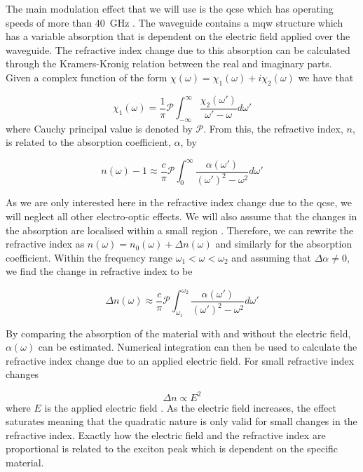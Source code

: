 The main modulation effect that we will use is the \ac{qcse} which has operating speeds of more than \SI{40}{GHz} \cite{qcse, smit2014}. The waveguide contains a \ac{mqw} structure which has a variable absorption that is dependent on the electric field applied over the waveguide. The refractive index change due to this absorption can be calculated through the Kramers-Kronig relation between the real and imaginary parts. Given a complex function of the form $\chi(\omega) = \chi_1(\omega) + i \chi_2(\omega)$ we have that

\begin{equation}
	\chi_1(\omega) = \frac{1}{\pi} \mathcal{P} \int_{-\infty}^{\infty} \frac{\chi_2(\omega')}{\omega' - \omega} d\omega'
\end{equation}
where Cauchy principal value is denoted by $\mathcal{P}$. From this, the refractive index, $n$, is related to the absorption coefficient, $\alpha$, by \cite{Hutchings1992}

\begin{equation}
	n(\omega) - 1 \approx \frac{c}{\pi}\mathcal{P}\int_0^\infty \frac{\alpha(\omega')}{(\omega')^2 - \omega^2} d\omega'
\end{equation}

As we are only interested here in the refractive index change due to the \ac{qcse}, we will neglect all other electro-optic effects. We will also assume that the changes in the absorption are localised within a small region \cite{weiner1987}. Therefore, we can rewrite the refractive index as $n(\omega) = n_0(\omega) + \Delta n (\omega)$ and similarly for the absorption coefficient. Within the frequency range $\omega_1 < \omega < \omega_2$ and assuming that $\Delta \alpha \ne 0$, we find the change in refractive index to be

\begin{equation}
	\Delta n(\omega) \approx \frac{c}{\pi}\mathcal{P}\int_{\omega_1}^{\omega_2} \frac{\alpha(\omega')}{(\omega')^2 - \omega^2} d\omega'
\end{equation}

By comparing the absorption of the material with and without the electric field, $\alpha(\omega)$ can be estimated. Numerical integration can then be used to calculate the refractive index change due to an applied electric field. For small refractive index changes

\begin{equation}
	\Delta n \propto E^2
\end{equation}
where $E$ is the applied electric field \cite{qcse}. As the electric field increases, the effect saturates meaning that the quadratic nature is only valid for small changes in the refractive index. Exactly how the electric field and the refractive index are proportional is related to the exciton peak which is dependent on the specific material. 

